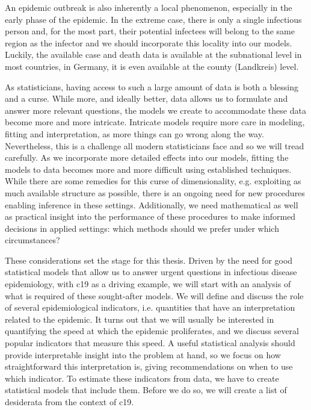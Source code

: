 An epidemic outbreak is also inherently a local phenomenon, especially in the early phase of the epidemic. In the extreme case, there is only a single infectious person and, for the most part, their potential infectees will belong to the same region as the infector and we should incorporate this locality into our models. Luckily, the available case and death data is available at the subnational level in most countries, in Germany, it is even available at the county (Landkreis) level. 

As statisticians, having access to such a large amount of data is both a blessing and a curse. While more, and ideally better, data allows us to formulate and answer more relevant questions, the models we create to accommodate these data become more and more intricate. Intricate models require more care in modeling, fitting and interpretation, as more things can go wrong along the way. Nevertheless, this is a challenge all modern statisticians face and so we will tread carefully. As we incorporate more detailed effects into our models, fitting the models to data becomes more and more difficult using established techniques. While there are some remedies for this curse of dimensionality, e.g. exploiting as much available structure as possible, there is an ongoing need for new procedures enabling inference in these settings. Additionally, we need mathematical as well as practical insight into the performance of these procedures to make informed decisions in applied settings: which methods should we prefer under which circumstances?

These considerations set the stage for this thesis. Driven by the need for good statistical models that allow us to answer urgent questions in infectious disease epidemiology, with \acrshort{c19} as a driving example, we will start with an analysis of what is required of these sought-after models. We will define and discuss the role of several epidemiological indicators, i.e. quantities that have an interpretation related to the epidemic. It turns out that we will usually be interested in quantifying the speed at which the epidemic proliferates, and we discuss several popular indicators that measure this speed. A useful statistical analysis should provide interpretable insight into the problem at hand, so we focus on how straightforward this interpretation is, giving recommendations on when to use which indicator. To estimate these indicators from data, we have to create statistical models that include them. Before we do so, we will create a list of desiderata from the context of \acrshort{c19}. 

